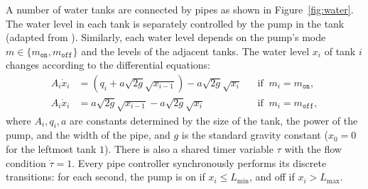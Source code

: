 A number of water tanks are connected by pipes as shown in Figure~\ref{fig:water}.
The water level in each tank is separately controlled by the pump in the tank
(adapted from \cite{kowalewski1999case,raisch1999approximating}).
Similarly, each water level depends on the pump's mode $m \in \{m_\texttt{on}, m_\texttt{off}\}$
and the levels of the adjacent tanks.
The water level $x_i$ of tank $i$ changes according to the differential equations:
\[
\begin{aligned}
A_i \dot{x}_i &=  (q_i + a \sqrt{2g} \sqrt{x_{i-1}})  - a \sqrt{2g} \sqrt{x_i}
&& \mbox{if}\;\; m_i = m_\texttt{on},
\\
A_i \dot{x}_i &= a \sqrt{2g} \sqrt{x_{i-1}}  - a \sqrt{2g} \sqrt{x_i}
&& \mbox{if}\;\; m_i = m_\texttt{off},
\end{aligned}
\]
where $A_i, q_i, a $ are constants determined by the size of the tank, the power of the pump, 
and the width of the pipe,
and $g$ is the standard gravity constant ($x_0 = 0$ for the leftmost tank $1$).
%
There is also a shared timer variable $\tau$ 
with the flow condition $\dot{\tau} = 1$.
Every pipe controller synchronously performs its discrete transitions:
for each second, 
the pump is on if $x_i \leq L_{\min}$, and off if $x_i > L_{\max}$.



